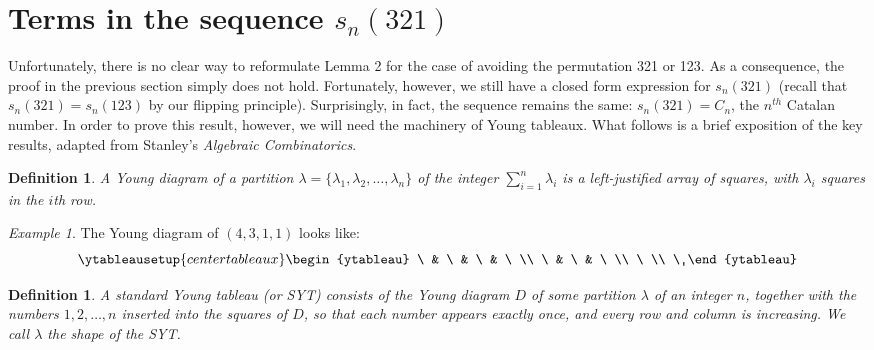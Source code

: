 \documentclass[11pt,letterpaper,twoside,english]{article}
\theoremstyle{theorem}
\newtheorem{definition}[theorem]{Definition}
\theoremstyle{remark}
\newtheorem{example}{Example}
\begin{document}
\section{Terms in the sequence $s_n(321)$}

Unfortunately, there is no clear way to reformulate Lemma 2 for the case of avoiding the permutation 321 or 123. As a consequence, the proof in the previous section simply does not hold. Fortunately, however, we still have a closed form expression for $s_n(321)$ (recall that $s_n(321)=s_n(123)$ by our flipping principle). Surprisingly, in fact, the sequence remains the same: $s_n(321)=C_n$, the $n^{th}$ Catalan number. In order to prove this result, however, we will need the machinery of Young tableaux. What follows is a brief exposition of the key results, adapted from Stanley's \emph{Algebraic Combinatorics}.

\begin{definition}
A Young diagram of a partition $\lambda=\{\lambda_1, \lambda_2, \ldots, \lambda_n\}$ of the integer $\sum_{i=1}^n \lambda_i$ is a left-justified array of squares, with $\lambda_i$ squares in the $i$th row.
\end{definition}
\begin{example}
The Young diagram of $(4, 3, 1, 1)$ looks like:
\[
\ytableausetup{centertableaux}
\begin{ytableau}
\ & \ & \ & \ \\
\ & \ & \ \\
\ \\
\
\end{ytableau}
\]
\end{example}

\begin{definition}
A standard Young tableau (or SYT) consists of the Young diagram $D$ of some partition $\lambda$ of an integer $n$, together with the numbers $1, 2, \ldots, n$ inserted into the squares of $D$, so that each number appears exactly once, and every row and column is \emph{increasing}. We call $\lambda$ the \emph{shape} of the SYT.
\end{definition}
\end{document}
